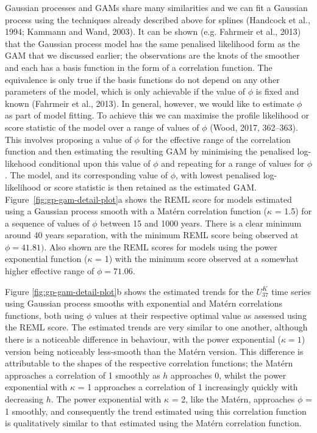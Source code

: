 \documentclass[12pt,]{article}
\newcommand{\uk}{\ensuremath{\mathit{U}^{\mathit{K}}_{\mathup{37}}}}
\begin{document}
Gaussian processes and GAMs share many similarities and we can fit a
Gaussian process using the techniques already described above for
splines (Handcock et al., 1994; Kammann and Wand, 2003). It can be shown
(e.g. Fahrmeir et al., 2013) that the Gaussian process model has the
same penalised likelihood form as the GAM that we discussed earlier; the
observations are the knots of the smoother and each has a basis function
in the form of a correlation function. The equivalence is only true if
the basis functions do not depend on any other parameters of the model,
which is only achievable if the value of \(\phi\) is fixed and known
(Fahrmeir et al., 2013). In general, however, we would like to estimate
\(\phi\) as part of model fitting. To achieve this we can maximise the
profile likelihood or score statistic of the model over a range of
values of \(\phi\) (Wood, 2017, 362--363). This involves proposing a
value of \(\phi\) for the effective range of the correlation function
and then estimating the resulting GAM by minimising the penalised
log-likehood conditional upon this value of \(\phi\) and repeating for a
range of values for \(\phi\). The model, and its corresponding value of
\(\phi\), with lowest penalised log-likelihood or score statistic is
then retained as the estimated GAM. Figure~\ref{fig:gp-gam-detail-plot}a
shows the REML score for models estimated using a Gaussian process
smooth with a Matérn correlation function (\(\kappa\) = 1.5) for a
sequence of values of \(\phi\) between 15 and 1000 years. There is a
clear minimum around 40 years separation, with the minimum REML score
being observed at \(\phi = 41.81)\). Also shown are the REML scores for
models using the power exponential function (\(\kappa\) = 1) with the
minimum score observed at a somewhat higher effective range of
\(\phi = 71.06\).

Figure \ref{fig:gp-gam-detail-plot}b shows the estimated trends for the
\uk{} time series using Gaussian process smooths with exponential and
Matérn correlations functions, both using \(\phi\) values at their
respective optimal value as assessed using the REML score. The estimated
trends are very similar to one another, although there is a noticeable
difference in behaviour, with the power exponential (\(\kappa = 1\))
version being noticeably less-smooth than the Matérn version. This
difference is attributable to the shapes of the respective correlation
functions; the Matérn approaches a correlation of 1 smoothly as \(h\)
approaches 0, whilst the power exponential with \(\kappa\) = 1
approaches a correlation of 1 increasingly quickly with decreasing
\(h\). The power exponential with \(\kappa\) = 2, like the Matérn,
approaches \(\phi\) = 1 smoothly, and consequently the trend estimated
using this correlation function is qualitatively similar to that
estimated using the Matérn correlation function.
\end{document}
